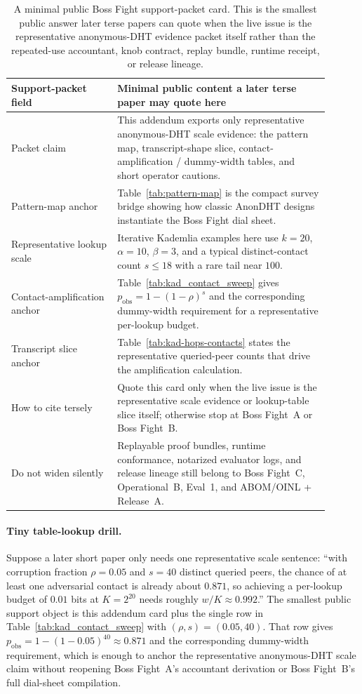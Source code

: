 \documentclass[11pt]{article}
\begin{document}
\begin{table}[H]
\centering
\begin{tabular}{@{}p{0.30\linewidth}p{0.60\linewidth}@{}}
\toprule
Support-packet field & Minimal public content a later terse paper may quote here \\
\midrule
Packet claim & This addendum exports only representative anonymous-DHT scale evidence: the pattern map, transcript-shape slice, contact-amplification / dummy-width tables, and short operator cautions. \\
Pattern-map anchor & Table~\ref{tab:pattern-map} is the compact survey bridge showing how classic AnonDHT designs instantiate the Boss Fight dial sheet. \\
Representative lookup scale & Iterative Kademlia examples here use $k=20$, $\alpha=10$, $\beta=3$, and a typical distinct-contact count $s\le 18$ with a rare tail near $100$. \\
Contact-amplification anchor & Table~\ref{tab:kad_contact_sweep} gives $p_{\mathrm{obs}}=1-(1-\rho)^s$ and the corresponding dummy-width requirement for a representative per-lookup budget. \\
Transcript slice anchor & Table~\ref{tab:kad-hops-contacts} states the representative queried-peer counts that drive the amplification calculation. \\
How to cite tersely & Quote this card only when the live issue is the representative scale evidence or lookup-table slice itself; otherwise stop at Boss Fight~A or Boss Fight~B. \\
Do not widen silently & Replayable proof bundles, runtime conformance, notarized evaluator logs, and release lineage still belong to Boss Fight~C, Operational~B, Eval~1, and ABOM/OINL + Release~A. \\
\bottomrule
\end{tabular}
\caption{A minimal public Boss Fight support-packet card. This is the smallest public answer later terse papers can quote when the live issue is the representative anonymous-DHT evidence packet itself rather than the repeated-use accountant, knob contract, replay bundle, runtime receipt, or release lineage.}
\label{tab:bossfight-addendum-card}
\end{table}

\paragraph{Tiny table-lookup drill.}
Suppose a later short paper only needs one representative scale sentence: ``with corruption fraction $\rho=0.05$ and $s=40$ distinct queried peers, the chance of at least one adversarial contact is already about $0.871$, so achieving a per-lookup budget of $0.01$ bits at $K=2^{20}$ needs roughly $w/K \approx 0.992$.''
The smallest public support object is this addendum card plus the single row in Table~\ref{tab:kad_contact_sweep} with $(\rho,s)=(0.05,40)$.
That row gives $p_{\mathrm{obs}}=1-(1-0.05)^{40}\approx 0.871$ and the corresponding dummy-width requirement, which is enough to anchor the representative anonymous-DHT scale claim without reopening Boss Fight~A's accountant derivation or Boss Fight~B's full dial-sheet compilation.
\end{document}
